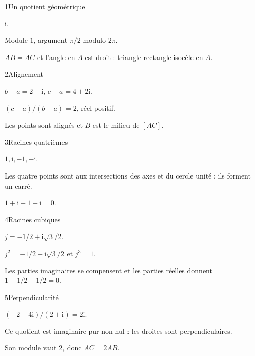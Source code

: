 \begin{corrige}{1}{Un quotient géométrique}
\begin{questions}
\item $\mathrm i$.
\item Module $1$, argument $\pi/2$ modulo $2\pi$.
\item $AB=AC$ et l’angle en $A$ est droit : triangle rectangle isocèle en $A$.
\end{questions}
\end{corrige}
\begin{corrige}{2}{Alignement}
\begin{questions}
\item $b-a=2+\mathrm i$, $c-a=4+2\mathrm i$.
\item $(c-a)/(b-a)=2$, réel positif.
\item Les points sont alignés et $B$ est le milieu de $[AC]$.
\end{questions}
\end{corrige}
\begin{corrige}{3}{Racines quatrièmes}
\begin{questions}
\item $1,\mathrm i,-1,-\mathrm i$.
\item Les quatre points sont aux intersections des axes et du cercle unité : ils forment un carré.
\item $1+\mathrm i-1-\mathrm i=0$.
\end{questions}
\end{corrige}
\begin{corrige}{4}{Racines cubiques}
\begin{questions}
\item $j=-1/2+\mathrm i\sqrt3/2$.
\item $j^2=-1/2-\mathrm i\sqrt3/2$ et $j^3=1$.
\item Les parties imaginaires se compensent et les parties réelles donnent $1-1/2-1/2=0$.
\end{questions}
\end{corrige}
\begin{corrige}{5}{Perpendicularité}
\begin{questions}
\item $(-2+4\mathrm i)/(2+\mathrm i)=2\mathrm i$.
\item Ce quotient est imaginaire pur non nul : les droites sont perpendiculaires.
\item Son module vaut $2$, donc $AC=2AB$.
\end{questions}
\end{corrige}
